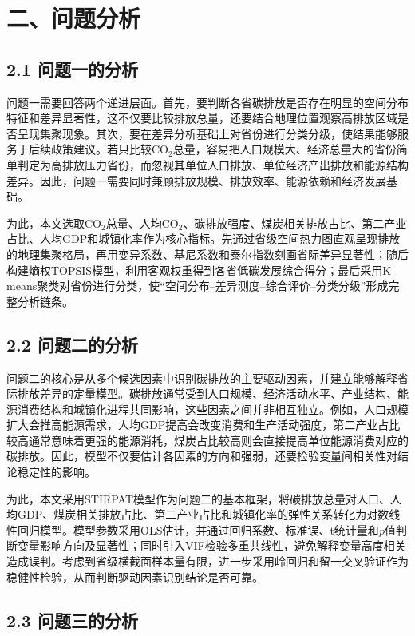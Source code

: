 \documentclass[UTF8,zihao=-4,fontset=fandol]{ctexart}
\begin{document}
\section*{二、问题分析}

\subsection*{2.1 问题一的分析}

问题一需要回答两个递进层面。首先，要判断各省碳排放是否存在明显的空间分布特征和差异显著性，这不仅要比较排放总量，还要结合地理位置观察高排放区域是否呈现集聚现象。其次，要在差异分析基础上对省份进行分类分级，使结果能够服务于后续政策建议。若只比较CO$_2$总量，容易把人口规模大、经济总量大的省份简单判定为高排放压力省份，而忽视其单位人口排放、单位经济产出排放和能源结构差异。因此，问题一需要同时兼顾排放规模、排放效率、能源依赖和经济发展基础。

为此，本文选取CO$_2$总量、人均CO$_2$、碳排放强度、煤炭相关排放占比、第二产业占比、人均GDP和城镇化率作为核心指标。先通过省级空间热力图直观呈现排放的地理集聚格局，再用变异系数、基尼系数和泰尔指数刻画省际差异显著性；随后构建熵权TOPSIS模型，利用客观权重得到各省低碳发展综合得分；最后采用K-means聚类对省份进行分类，使“空间分布--差异测度--综合评价--分类分级”形成完整分析链条。

\subsection*{2.2 问题二的分析}

问题二的核心是从多个候选因素中识别碳排放的主要驱动因素，并建立能够解释省际排放差异的定量模型。碳排放通常受到人口规模、经济活动水平、产业结构、能源消费结构和城镇化进程共同影响，这些因素之间并非相互独立。例如，人口规模扩大会推高能源需求，人均GDP提高会改变消费和生产活动强度，第二产业占比较高通常意味着更强的能源消耗，煤炭占比较高则会直接提高单位能源消费对应的碳排放。因此，模型不仅要估计各因素的方向和强弱，还要检验变量间相关性对结论稳定性的影响。

为此，本文采用STIRPAT模型作为问题二的基本框架，将碳排放总量对人口、人均GDP、煤炭相关排放占比、第二产业占比和城镇化率的弹性关系转化为对数线性回归模型。模型参数采用OLS估计，并通过回归系数、标准误、t统计量和$p$值判断变量影响方向及显著性；同时引入VIF检验多重共线性，避免解释变量高度相关造成误判。考虑到省级横截面样本量有限，进一步采用岭回归和留一交叉验证作为稳健性检验，从而判断驱动因素识别结论是否可靠。

\subsection*{2.3 问题三的分析}
\end{document}

